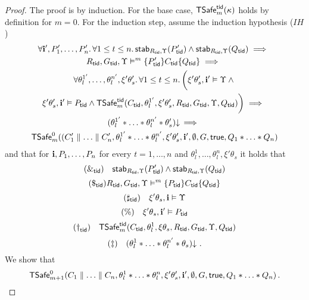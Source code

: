 {\begin{lemma}[Par]
\end{lemma}


\begin{proof}
The proof is by induction.
For the base case, $\safe_m(\kappa)$ holds by definition for $m=0$.
For the induction step, 
assume  
the induction hypothesis ($IH$) 
\begin{multline*}
\forall \intp',P'_1,\ldots,P'_n.\,
 \forall 1 \leq t \leq n.\, 
\stable{P'_\ltid}{R_\ltid}{\Upsilon} \land 
\stable{Q_\ltid}{R_\ltid}{\Upsilon} \implies \mbox{} \\
R_\ltid,G_\ltid,\Upsilon \vDash^m \{P'_\ltid\} C_\ltid \{ Q_\ltid \} \implies \mbox{}\\
\forall \theta_l^{1'},\ldots,\theta_l^{n'},\xi'\theta'_s.\,
\forall 1 \leq t \leq n.\,
\bigg(\xi'\theta'_s,\intp'\vDash \Upsilon \land \mbox{}\\
\xi'\theta'_s,\intp'\vDash P_\ltid  \land \safe_m(C_\ltid,\theta_l^{1'},\xi'\theta'_s,R_\ltid,G_\ltid,\Upsilon, Q_\ltid) \bigg)
\implies \mbox{}\\
\consistent{\theta_l^{1'}*\ldots*\theta_l^{n'}*\theta'_s}
\implies \mbox{} \\
\safe[0]_m( (C'_1 \parallel \ldots \parallel C'_n,\theta^{1'}_l * \ldots * \theta^{n'}_l,
\xi'\theta'_s,\intp',\emptyset,G,\true,Q_1 * \ldots * Q_n)
\end{multline*}
%
%
%
%
and that for $\intp,P_1,\ldots,P_n$ for every $t=1,\ldots,n$ 
and $\theta_l^{1},\ldots,\theta_l^{n},\xi'\theta_s$
it holds that 
\[
(\&_\ltid) \quad
\stable{P'_\ltid}{R_\ltid}{\Upsilon} \land 
\stable{Q_\ltid}{R_\ltid}{\Upsilon} 
\]
\[
(\$_\ltid) R_\ltid,G_\ltid,\Upsilon \vDash^m \{P_\ltid\} C_\ltid \{ Q_\ltid \} 
\]
\[
(\sharp_\ltid) \quad \xi'\theta_s,\intp\vDash \Upsilon 
\]
\[
(\%) \quad \xi'\theta_s,\intp'\vDash P_\ltid  
\]
\[
(\dag_\ltid) \quad \safe_m(C_\ltid,\theta_l^{1},\xi\theta_s,R_\ltid,G_\ltid,\Upsilon, Q_\ltid) 
\]
\[
(\ddag) \quad \consistent{\theta_l^{1}*\ldots*\theta_l^{n'}*\theta_s}\,.
\]
We show that 
\[
\safe[0]_{m+1}(C_1 \parallel \ldots \parallel C_n,\theta^{1}_l * \ldots * \theta^{n}_l,
\xi'\theta'_s,\intp',\emptyset,G,\true,Q_1 * \ldots * Q_n)\,.
\]



\end{proof}}
